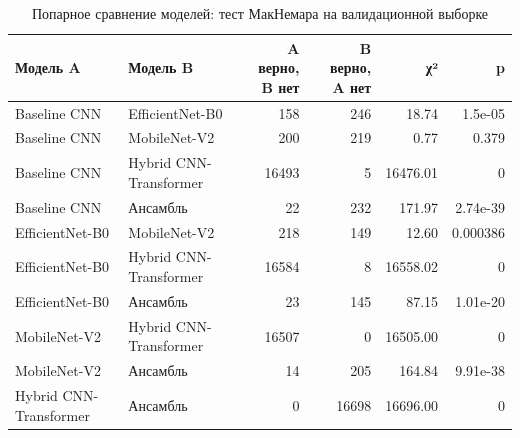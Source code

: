 \begin{table}[htbp]
\centering
\caption{Попарное сравнение моделей: тест МакНемара на валидационной выборке}
\label{tab:mcnemar}
\begin{tabular}{llrrrr}
\toprule
Модель A & Модель B & A верно, B нет & B верно, A нет & χ² & p \\
\midrule
Baseline CNN & EfficientNet-B0 & 158 & 246 & 18.74 & 1.5e-05 \\
Baseline CNN & MobileNet-V2 & 200 & 219 & 0.77 & 0.379 \\
Baseline CNN & Hybrid CNN-Transformer & 16493 & 5 & 16476.01 & 0 \\
Baseline CNN & Ансамбль & 22 & 232 & 171.97 & 2.74e-39 \\
EfficientNet-B0 & MobileNet-V2 & 218 & 149 & 12.60 & 0.000386 \\
EfficientNet-B0 & Hybrid CNN-Transformer & 16584 & 8 & 16558.02 & 0 \\
EfficientNet-B0 & Ансамбль & 23 & 145 & 87.15 & 1.01e-20 \\
MobileNet-V2 & Hybrid CNN-Transformer & 16507 & 0 & 16505.00 & 0 \\
MobileNet-V2 & Ансамбль & 14 & 205 & 164.84 & 9.91e-38 \\
Hybrid CNN-Transformer & Ансамбль & 0 & 16698 & 16696.00 & 0 \\
\bottomrule
\end{tabular}
\end{table}
